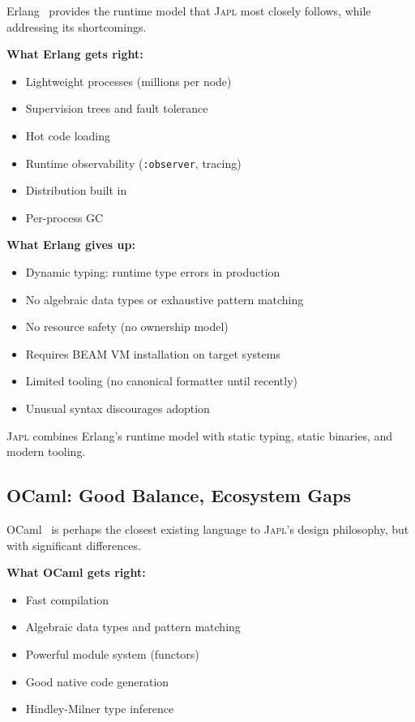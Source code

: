 \documentclass[11pt,twocolumn]{article}
\newcommand{\japl}{\textsc{Japl}}
\begin{document}
Erlang~\citep{armstrong2003erlang,armstrong2007erlang} provides the runtime model that \japl{} most closely follows, while addressing its shortcomings.

\textbf{What Erlang gets right:}
\begin{itemize}[leftmargin=*]
\item Lightweight processes (millions per node)
\item Supervision trees and fault tolerance
\item Hot code loading
\item Runtime observability (\texttt{:observer}, tracing)
\item Distribution built in
\item Per-process GC
\end{itemize}

\textbf{What Erlang gives up:}
\begin{itemize}[leftmargin=*]
\item Dynamic typing: runtime type errors in production
\item No algebraic data types or exhaustive pattern matching
\item No resource safety (no ownership model)
\item Requires BEAM VM installation on target systems
\item Limited tooling (no canonical formatter until recently)
\item Unusual syntax discourages adoption
\end{itemize}

\japl{} combines Erlang's runtime model with static typing, static binaries, and modern tooling.

\subsection{OCaml: Good Balance, Ecosystem Gaps}

OCaml~\citep{leroy2014ocaml} is perhaps the closest existing language to \japl{}'s design philosophy, but with significant differences.

\textbf{What OCaml gets right:}
\begin{itemize}[leftmargin=*]
\item Fast compilation
\item Algebraic data types and pattern matching
\item Powerful module system (functors)
\item Good native code generation
\item Hindley-Milner type inference
\end{itemize}
\end{document}
